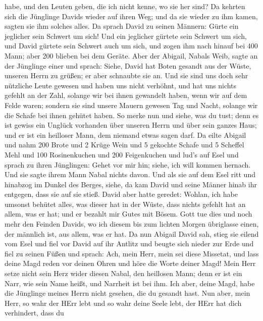 habe, und den Leuten geben, die ich nicht kenne, wo sie her sind?
 Da kehrten sich die Jünglinge Davids wieder auf ihren Weg;
und da sie wieder zu ihm kamen, sagten sie ihm solches alles.
 Da sprach David zu seinen Männern: Gürte ein jeglicher
sein Schwert um sich! Und ein jeglicher gürtete sein Schwert um sich,
und David gürtete sein Schwert auch um sich, und zogen ihm nach hinauf
bei 400 Mann; aber 200 blieben bei dem Geräte.  Aber der
Abigail, Nabals Weib, sagte an der Jünglinge einer und sprach: Siehe,
David hat Boten gesandt aus der Wüste, unseren Herrn zu grüßen; er aber
schnaubte sie an.  Und sie sind uns doch sehr nützliche
Leute gewesen und haben uns nicht verhöhnt, und hat uns nichts gefehlt
an der Zahl, solange wir bei ihnen gewandelt haben, wenn wir auf dem
Felde waren;  sondern sie sind unsere Mauern gewesen Tag
und Nacht, solange wir die Schafe bei ihnen gehütet haben. 
So merke nun und siehe, was du tust; denn es ist gewiss ein Unglück
vorhanden über unseren Herrn und über sein ganzes Haus; und er ist ein
heilloser Mann, dem niemand etwas sagen darf.  Da eilte
Abigail und nahm 200 Brote und 2 Krüge Wein und 5 gekochte Schafe und 5
Scheffel Mehl und 100 Rosinenkuchen und 200 Feigenkuchen und lud's auf
Esel  und sprach zu ihren Jünglingen: Gehet vor mir hin;
siehe, ich will kommen hernach. Und sie sagte ihrem Mann Nabal nichts
davon.  Und als sie auf dem Esel ritt und hinabzog im
Dunkel des Berges, siehe, da kam David und seine Männer hinab ihr
entgegen, dass sie auf sie stieß.  David aber hatte
geredet: Wohlan, ich habe umsonst behütet alles, was dieser hat in der
Wüste, dass nichts gefehlt hat an allem, was er hat; und er bezahlt mir
Gutes mit Bösem.  Gott tue dies und noch mehr den Feinden
Davids, wo ich diesem bis zum lichten Morgen übriglasse einen, der
männlich ist, aus allem, was er hat.  Da nun Abigail David
sah, stieg sie eilend vom Esel und fiel vor David auf ihr Antlitz und
beugte sich nieder zur Erde  und fiel zu seinen Füßen und
sprach: Ach, mein Herr, mein sei diese Missetat, und lass deine Magd
reden vor deinen Ohren und höre die Worte deiner Magd! 
Mein Herr setze nicht sein Herz wider diesen Nabal, den heillosen Mann;
denn er ist ein Narr, wie sein Name heißt, und Narrheit ist bei ihm. Ich
aber, deine Magd, habe die Jünglinge meines Herrn nicht gesehen, die du
gesandt hast.  Nun aber, mein Herr, so wahr der HErr lebt
und so wahr deine Seele lebt, der HErr hat dich verhindert, dass du
